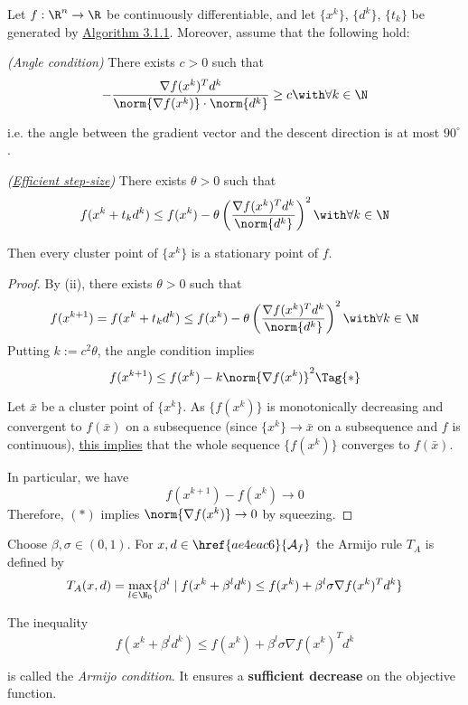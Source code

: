 Let $f:\R^n\to\R$ be continuously differentiable, and let $\{x^k\}$,
$\{d^k\}$, $\{t_k\}$ be generated by \href{edbf62c}{Algorithm 3.1.1}.
Moreover, assume that the following hold:
\begin{enumerati}
	\item \textit{(Angle condition)} There exists $c>0$ such that
	$$
		-\frac{\nabla f(x^k)^Td^k}{\norm{\nabla f(x^k)}\cdot\norm{d^k}}\geq c\with\forall k\in\N
	$$

	i.e. the angle between the gradient vector and the descent direction
	is at most $90^\circ$.
	\item \textit{(\href{d23fdf0}{Efficient step-size})} There exists
	$\theta>0$ such that
	$$
		f(x^k+t_kd^k)\leq f(x^k)-\theta\left(
		\frac{\nabla f(x^k)^Td^k}{\norm{d^k}}
		\right)^2\with\forall k\in\N
	$$
\end{enumerati}
Then every cluster point of $\{x^k\}$ is a stationary point of $f$.

\begin{proof}
	By (ii), there exists $\theta>0$ such that
	$$
		f(x^{k+1})=f(x^k+t_kd^k)\leq
		f(x^k)-\theta\left(
		\frac{\nabla f(x^k)^Td^k}{\norm{d^k}}
		\right)^2\with\forall k\in\N
	$$
	Putting $k:=c^2\theta$, the angle condition implies
	\begin{equation*}
		f(x^{k+1})\leq f(x^k)-k\norm{\nabla f(x^k)}^2\Tag{*}
	\end{equation*}

	Let $\bar x$ be a cluster point of $\{x^k\}$. As $\{f(x^k)\}$ is
	monotonically decreasing and convergent to $f(\bar x)$ on a
	subsequence (since $\{x^k\}\to\bar x$ on a subsequence and $f$ is
	continuous), \href{aaf3ba6}{this implies} that the whole sequence
	$\{f(x^k)\}$ converges to $f(\bar x)$.

	In particular, we have
	$$
		f(x^{k+1})-f(x^k)\to0
	$$
	Therefore, $(*)$ implies $\norm{\nabla f(x^k)}\to0$ by squeezing.
\end{proof}

\label{fefb024}

Choose $\beta,\sigma\in(0,1)$. For $x,d\in\href{ae4eac6}{\mathcal
		A_f}$ the Armijo rule $T_A$ is defined by
$$
	T_A(x,d)=\max_{l\in\N_0}\{\beta^l\mid f(x^k+\beta^ld^k)\leq
	f(x^k)+\beta^l\sigma\nabla f(x^k)^Td^k\}
$$

The inequality
$$
	f(x^k+\beta^ld^k)\leq f(x^k)+\beta^l\sigma\nabla f(x^k)^Td^k
$$

is called the \textit{Armijo condition}. It ensures a
\textbf{sufficient decrease} on the objective function.

